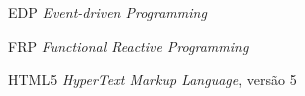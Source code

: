 \begin{siglas}
  \item[EDP] \emph{Event-driven Programming}
  \item[FRP] \emph{Functional Reactive Programming}
  \item[HTML5] \emph{HyperText Markup Language}, versão 5
\end{siglas}


